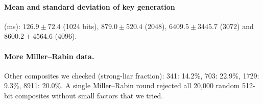 \documentclass[runningheads]{llncs}
\begin{document}
\paragraph{Mean and standard deviation of key generation} (ms):
$126.9 \pm 72.4$ (1024 bits), $879.0 \pm 520.4$ (2048), $6409.5 \pm 3445.7$
(3072) and $8600.2 \pm 4564.6$ (4096).

\paragraph{More Miller--Rabin data.} Other composites we checked
(strong-liar fraction): 341: 14.2\%, 703: 22.9\%, 1729: 9.3\%,
8911: 20.0\%. A single Miller--Rabin round rejected all 20{,}000 random
512-bit composites without small factors that we tried.
\end{document}
